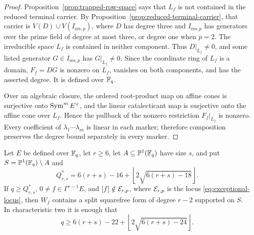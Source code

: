 \begin{proof}
Proposition~\ref{prop:trapped-row-space} says that \(L_f\) is
not contained in the reduced terminal carrier.  By
Proposition~\ref{prop:reduced-terminal-carrier}, that carrier is
\(V(D)\cup V(I_{\mathrm{res},p})\), where \(D\) has degree three and
\(I_{\mathrm{res},p}\) has generators over the prime field of degree at
most three, or degree one when \(p=2\).  The irreducible space \(L_f\) is
contained in neither component.  Thus \(D|_{L_f}\ne0\), and some listed
generator \(G\in I_{\mathrm{res},p}\) has \(G|_{L_f}\ne0\).  Since the
coordinate ring of \(L_f\) is a domain, \(F_f=DG\) is nonzero on \(L_f\),
vanishes on both components, and has the asserted degree.  It is defined
over \(\mathbb F_q\).

Over an algebraic closure, the ordered root-product map on affine cones is
surjective onto \(\operatorname{Sym}^mE^\vee\), and the linear catalecticant map is
surjective onto the affine cone over \(L_f\).  Hence the pullback of the
nonzero restriction \(F_f|_{L_f}\) is nonzero.  Every
coefficient of \(\lambda_1\cdots\lambda_m\) is linear in each marker;
therefore composition preserves the degree bound separately in every
marker.
\end{proof}

\begin{theorem}
\label{thm:simultaneous-marker-escape}%
%
%
Let \(E\) be defined over \(\mathbb F_q\), let \(r\geq6\), let
\(A\subseteq\mathbb P^1(\mathbb F_q)\) have size \(s\), and put
\(S=\mathbb P^1(\mathbb F_q)\setminus A\) and
\[
 Q^*_{r,s}=6(r+s)-16+
 \left\lfloor2\sqrt{6(r+s)-18}\right\rfloor .
\]
If \(q\geq Q^*_{r,s}\), \(0\ne f\in\Gamma^{r-1}E\), and
\([f]\notin\mathcal E_{r,p}\), where \(\mathcal E_{r,p}\) is the locus
\eqref{eq:exceptional-locus}, then \(W_f\) contains a split
squarefree form of degree \(r-2\) supported on \(S\).  In characteristic
two it is enough that
\[
 q\geq6(r+s)-22+
 \left\lfloor2\sqrt{6(r+s)-24}\right\rfloor .
\]
\end{theorem}

